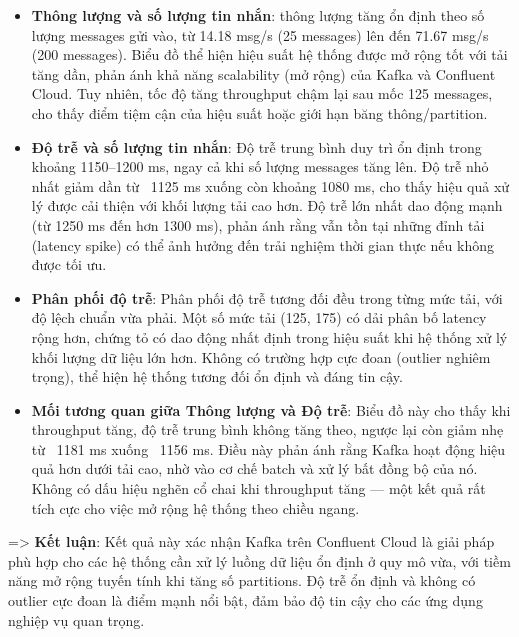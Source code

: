 \begin{itemize}[label=--]
    \item \textbf{Thông lượng và số lượng tin nhắn}: thông lượng tăng ổn định theo số lượng messages gửi vào, từ 14.18 msg/s (25 messages) lên đến 71.67 msg/s (200 messages). Biểu đồ thể hiện hiệu suất hệ thống được mở rộng tốt với tải tăng dần, phản ánh khả năng scalability (mở rộng) của Kafka và Confluent Cloud. Tuy nhiên, tốc độ tăng throughput chậm lại sau mốc 125 messages, cho thấy điểm tiệm cận của hiệu suất hoặc giới hạn băng thông/partition.
    \item \textbf{Độ trễ và số lượng tin nhắn}: Độ trễ trung bình duy trì ổn định trong khoảng 1150–1200 ms, ngay cả khi số lượng messages tăng lên. Độ trễ nhỏ nhất giảm dần từ ~1125 ms xuống còn khoảng 1080 ms, cho thấy hiệu quả xử lý được cải thiện với khối lượng tải cao hơn. Độ trễ lớn nhất dao động mạnh (từ 1250 ms đến hơn 1300 ms), phản ánh rằng vẫn tồn tại những đỉnh tải (latency spike) có thể ảnh hưởng đến trải nghiệm thời gian thực nếu không được tối ưu.
    \item \textbf{Phân phối độ trễ}: Phân phối độ trễ tương đối đều trong từng mức tải, với độ lệch chuẩn vừa phải. Một số mức tải (125, 175) có dải phân bố latency rộng hơn, chứng tỏ có dao động nhất định trong hiệu suất khi hệ thống xử lý khối lượng dữ liệu lớn hơn. Không có trường hợp cực đoan (outlier nghiêm trọng), thể hiện hệ thống tương đối ổn định và đáng tin cậy.
    \item \textbf{Mối tương quan giữa Thông lượng và Độ trễ}: Biểu đồ này cho thấy khi throughput tăng, độ trễ trung bình không tăng theo, ngược lại còn giảm nhẹ từ ~1181 ms xuống ~1156 ms. Điều này phản ánh rằng Kafka hoạt động hiệu quả hơn dưới tải cao, nhờ vào cơ chế batch và xử lý bất đồng bộ của nó. Không có dấu hiệu nghẽn cổ chai khi throughput tăng — một kết quả rất tích cực cho việc mở rộng hệ thống theo chiều ngang.
\end{itemize}
=> \textbf{Kết luận}: Kết quả này xác nhận Kafka trên Confluent Cloud là giải pháp phù hợp cho các hệ thống cần xử lý luồng dữ liệu ổn định ở quy mô vừa, với tiềm năng mở rộng tuyến tính khi tăng số partitions. Độ trễ ổn định và không có outlier cực đoan là điểm mạnh nổi bật, đảm bảo độ tin cậy cho các ứng dụng nghiệp vụ quan trọng.
